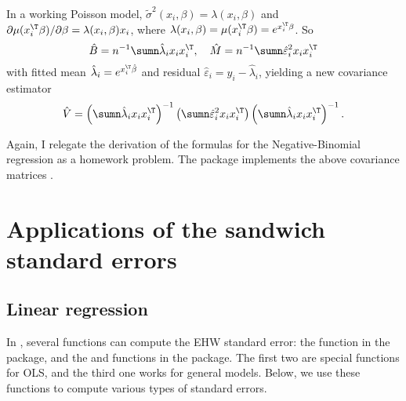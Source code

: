\begin{example}[continued]\label{eg::countpoissonmodel-continue2}
In a working Poisson model, $\tilde{\sigma}^2(x_i, \beta)  = \lambda(x_i, \beta)   $ and $ \partial\mu(x_{i}^{\T} \beta ) / \partial\beta  = \lambda(x_i, \beta)  x_i$, where $\lambda(x_i, \beta)  = \mu(x_i^{\T} \beta) = e^{x_i^{\T} \beta}  $. So
$$
\hat{B} = n^{-1}\sumn \hat{\lambda}_i  x_i x_i^{\T},\quad
\hat{M} = n^{-1}\sumn  \hat{\varepsilon}_i^2   x_i x_i^{\T}
$$
with fitted mean $ \hat{\lambda}_i =  e^{x_i^{\T} \hat{\beta} }  $ and residual $ \hat{\varepsilon}_i  = y_i -  \hat{\lambda}_i $, yielding a new covariance estimator
$$
\hat{V} = \left( \sumn  \hat{\lambda}_i   x_i x_i^{\T} \right)^{-1}
\left(\sumn \hat{\varepsilon}_i^2 x_i x_i^{\T} \right)
 \left( \sumn \hat{\lambda}_i x_i x_i^{\T} \right)^{-1} . 
$$
\end{example}

 

Again, I relegate the derivation of the formulas for the Negative-Binomial regression as a homework problem. 
The  package  implements the above covariance matrices \citep{zeileis2006object}. 



\section{Applications of the sandwich standard errors}

\subsection{Linear regression}


In , several functions can compute the EHW standard error: the  function in the  package, and the  and  functions in the  package. The first two are special functions for OLS, and the third one works for general models. Below, we use these functions to compute various types of standard errors. 

